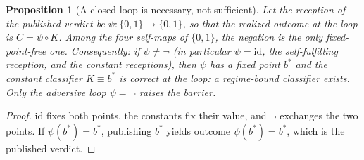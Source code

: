 \documentclass[11pt]{article}
\theoremstyle{plain}
\newtheorem{proposition}[theorem]{Proposition}
\theoremstyle{definition}
\theoremstyle{remark}
\begin{document}
\begin{proposition}[A closed loop is necessary, not sufficient]\label{prop:loop}
Let the reception of the published verdict be $\psi:\{0,1\}\to\{0,1\}$, so that the realized outcome at the loop is $C=\psi\circ K$. Among the four self-maps of $\{0,1\}$, the negation is the only fixed-point-free one. Consequently: if $\psi\ne\lnot$ (in particular $\psi=\mathrm{id}$, the self-fulfilling reception, and the constant receptions), then $\psi$ has a fixed point $b^*$ and the constant classifier $K\equiv b^*$ is correct at the loop: a regime-bound classifier exists. Only the adversive loop $\psi=\lnot$ raises the barrier.
\end{proposition}
\begin{proof}
$\mathrm{id}$ fixes both points, the constants fix their value, and $\lnot$ exchanges the two points. If $\psi(b^*)=b^*$, publishing $b^*$ yields outcome $\psi(b^*)=b^*$, which is the published verdict.
\end{proof}
\end{document}

